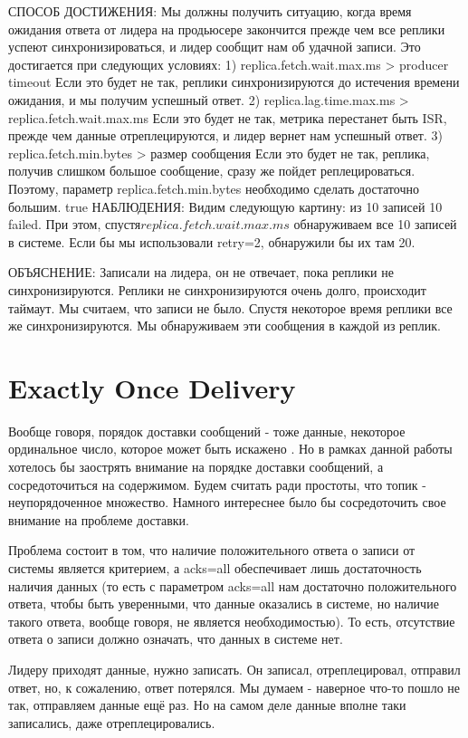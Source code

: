 \documentclass[11pt]{article}
\begin{document}
    СПОСОБ ДОСТИЖЕНИЯ: Мы должны получить ситуацию, когда время ожидания ответа от лидера на продьюсере закончится
    прежде чем все реплики успеют синхронизироваться, и лидер сообщит нам об удачной записи.
    Это достигается при следующих условиях:
        1) replica.fetch.wait.max.ms > producer timeout
            Если это будет не так, реплики синхронизируются до истечения времени ожидания, и мы получим успешный ответ.
        2) replica.lag.time.max.ms > replica.fetch.wait.max.ms
            Если это будет не так, метрика перестанет быть ISR, прежде чем данные отреплецируются, и лидер вернет нам
            успешный ответ.
        3) replica.fetch.min.bytes > размер сообщения
           Если это будет не так, реплика, получив слишком большое сообщение, сразу же пойдет реплецироваться.
           Поэтому, параметр replica.fetch.min.bytes необходимо сделать достаточно большим.
true
    НАБЛЮДЕНИЯ: Видим следующую картину: из 10 записей 10 failed. При
    этом, спустя$replica.fetch.wait.max.ms$ обнаруживаем все 10 записей в системе. Если бы мы использовали retry=2, обнаружили бы
    их там 20.

    ОБЪЯСНЕНИЕ: Записали на лидера, он не отвечает, пока реплики не синхронизируются. Реплики не синхронизируются
    очень долго, происходит таймаут. Мы считаем, что записи не было. Спустя некоторое время реплики все же
    синхронизируются. Мы обнаруживаем эти сообщения в каждой из реплик.

    \section{Exactly Once Delivery}
    Вообще говоря, порядок доставки сообщений - тоже данные, некоторое ординальное число, которое может быть искажено
    . Но в рамках данной работы хотелось бы заострять внимание на порядке доставки сообщений, а сосредоточиться на
    содержимом. Будем считать ради простоты, что топик - неупорядоченное множество. Намного интереснее было бы сосредоточить свое внимание на проблеме доставки.

    Проблема состоит в том, что наличие положительного ответа о записи от системы является критерием, а acks=all обеспечивает лишь достаточность наличия данных (то есть с параметром acks=all нам достаточно положительного ответа, чтобы быть уверенными, что данные оказались в системе, но наличие такого ответа, вообще говоря, не является необходимостью). То есть, отсутствие ответа о записи должно означать, что данных в системе нет.

    Лидеру приходят данные, нужно записать. Он записал, отреплецировал, отправил ответ, но, к сожалению, ответ потерялся. Мы думаем - наверное что-то пошло не так, отправляем данные ещё раз. Но на самом деле данные вполне таки записались, даже отреплецировались.
\end{document}

